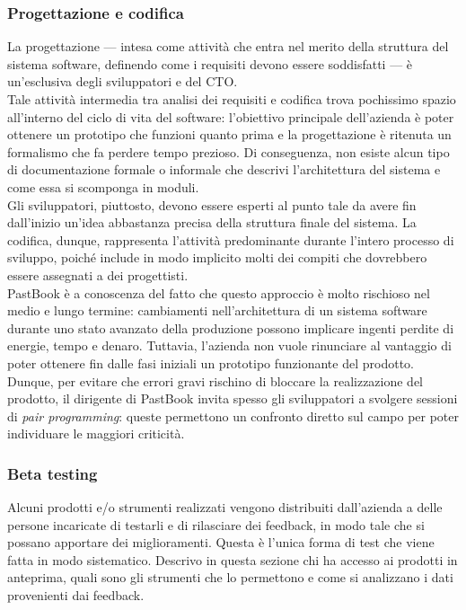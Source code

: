 			\subsubsection{Progettazione e codifica}
				La progettazione — intesa come attività che entra nel merito della struttura del sistema software, definendo come i
				requisiti devono essere soddisfatti — è un'esclusiva degli sviluppatori e del CTO.\\
				Tale attività intermedia tra analisi dei requisiti e codifica trova pochissimo spazio all'interno del ciclo di vita
				del software: l'obiettivo principale dell'azienda è poter ottenere un prototipo che funzioni quanto prima e la
				progettazione è ritenuta un formalismo che fa perdere tempo prezioso. Di conseguenza, non esiste alcun tipo di
				documentazione formale o informale che descrivi l'architettura del sistema e come essa si scomponga in moduli.\\
				Gli sviluppatori, piuttosto, devono essere esperti al punto tale da avere fin dall'inizio un'idea abbastanza precisa
				della struttura finale del sistema. La codifica, dunque, rappresenta l'attività predominante durante l'intero
				processo di sviluppo, poiché include in modo implicito molti dei compiti che dovrebbero essere assegnati a dei
				progettisti.\\
				PastBook è a conoscenza del fatto che questo approccio è molto rischioso nel medio e lungo termine: cambiamenti
				nell'architettura di un sistema software durante uno stato avanzato della produzione possono implicare ingenti
				perdite di energie, tempo e denaro. Tuttavia, l'azienda non vuole rinunciare al vantaggio di poter ottenere fin dalle
				fasi iniziali un prototipo funzionante del prodotto. Dunque, per evitare che errori gravi rischino di bloccare la
				realizzazione del prodotto, il dirigente di PastBook invita spesso gli sviluppatori a svolgere sessioni di
				\emph{pair programming}: queste permettono un confronto diretto sul campo per poter individuare le maggiori
				criticità.
			\subsubsection{Beta testing}
				Alcuni prodotti e/o strumenti realizzati vengono distribuiti dall'azienda a delle persone incaricate di testarli
				e di rilasciare dei feedback, in modo tale che si possano apportare dei miglioramenti. Questa è l'unica forma di
				test che viene fatta in modo sistematico. Descrivo in questa sezione chi ha accesso ai prodotti in anteprima, quali
				sono gli strumenti che lo permettono e come si analizzano i dati provenienti dai feedback.
